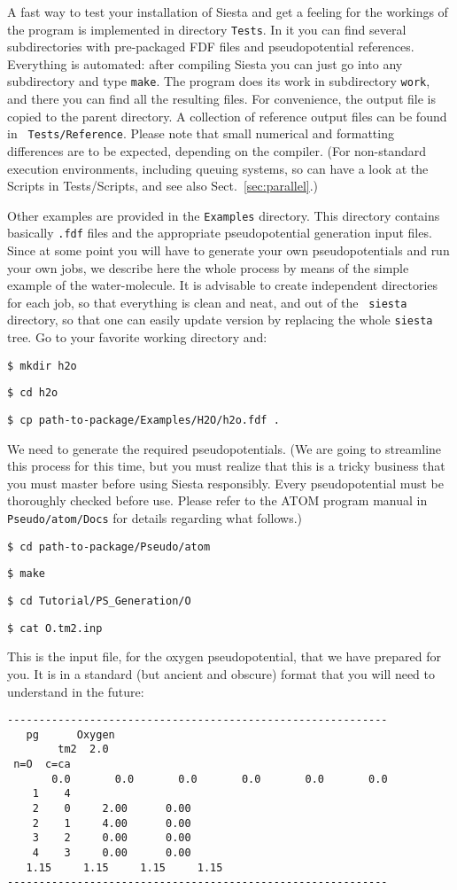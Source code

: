 \documentclass[11pt]{article}
\begin{document}
A fast way to test your installation of {\sc Siesta} and get a feeling
for the workings of the program is implemented in directory
{\tt Tests}. In it you can find several subdirectories
with pre-packaged FDF files and pseudopotential references. Everything
is automated: after compiling {\sc Siesta} you can just go into any
subdirectory and type {\tt make}. The program does its work in
subdirectory {\tt work}, and there you can find all the resulting
files. For convenience, the output file is copied to the parent
directory. A collection of reference output files can be found in {\tt
  Tests/Reference}. Please note that small numerical and
formatting differences are to be expected, depending on the compiler.
(For non-standard execution environments, including queuing systems,
so can have a look at the Scripts in Tests/Scripts, and see also Sect.~\ref{sec:parallel}.)

Other examples are provided in the {\tt Examples} directory. This
directory contains basically {\tt .fdf} files and the appropriate
pseudopotential generation input files. Since at some point you will
have to generate your own pseudopotentials and run your own jobs, we
describe here the whole process by means of the simple example of the
water-molecule. It is advisable to create independent directories for
each job, so that everything is clean and neat, and out of the {\tt
siesta} directory, so that one can easily update version by replacing
the whole {\tt siesta} tree. Go to your favorite working directory
and:

{\tt \$ mkdir h2o}

{\tt \$ cd h2o}

{\tt \$ cp path-to-package/Examples/H2O/h2o.fdf .}

\noindent
We need to generate the required pseudopotentials.
(We are going to streamline this process for this time, but
you must realize that this is a tricky business that you 
must master before using {\sc Siesta} responsibly. Every 
pseudopotential must be thoroughly checked before use. Please refer to
the {\sc ATOM} program manual in {\tt Pseudo/atom/Docs}
for details regarding what follows.)

{\tt \$ cd path-to-package/Pseudo/atom}

{\tt \$ make}

{\tt \$ cd Tutorial/PS\_Generation/O}

{\tt \$ cat O.tm2.inp}

\noindent
This is the input file, for the oxygen pseudopotential, 
that we have prepared for you. 
It is in a standard (but ancient and obscure) format that
you will need to understand in the future:
\begin{verbatim}
------------------------------------------------------------
   pg      Oxygen
        tm2  2.0
 n=O  c=ca 
       0.0       0.0       0.0       0.0       0.0       0.0
    1    4
    2    0     2.00      0.00
    2    1     4.00      0.00
    3    2     0.00      0.00
    4    3     0.00      0.00
   1.15     1.15     1.15     1.15
------------------------------------------------------------
\end{verbatim}
\end{document}
